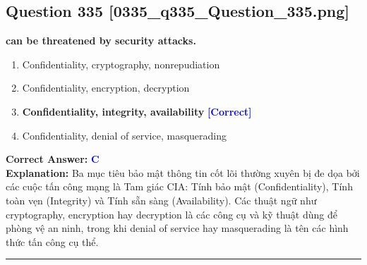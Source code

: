 \documentclass[11pt,a4paper]{article}
\begin{document}
\begin{minipage}{\textwidth}
\subsection*{Question 335 \quad \footnotesize{[0335\_q335\_Question\_335.png]}}
\noindent \textbf{can be threatened by security attacks.}

\begin{enumerate}[label=\Alph*.]
    \item Confidentiality, cryptography, nonrepudiation
    \item Confidentiality, encryption, decryption
    \item \textbf{Confidentiality, integrity, availability} \hfill \textcolor{blue}{\textbf{[Correct]}}
    \item Confidentiality, denial of service, masquerading
\end{enumerate}

\noindent \textbf{Correct Answer:} \textcolor{blue}{\textbf{C}} \\[2pt]
\noindent \textbf{Explanation:} Ba mục tiêu bảo mật thông tin cốt lõi thường xuyên bị đe dọa bởi các cuộc tấn công mạng là Tam giác CIA: Tính bảo mật (Confidentiality), Tính toàn vẹn (Integrity) và Tính sẵn sàng (Availability). Các thuật ngữ như cryptography, encryption hay decryption là các công cụ và kỹ thuật dùng để phòng vệ an ninh, trong khi denial of service hay masquerading là tên các hình thức tấn công cụ thể.

\par\vspace{0.3cm}
\hrule
\vspace{0.3cm}
\end{minipage}
\end{document}
